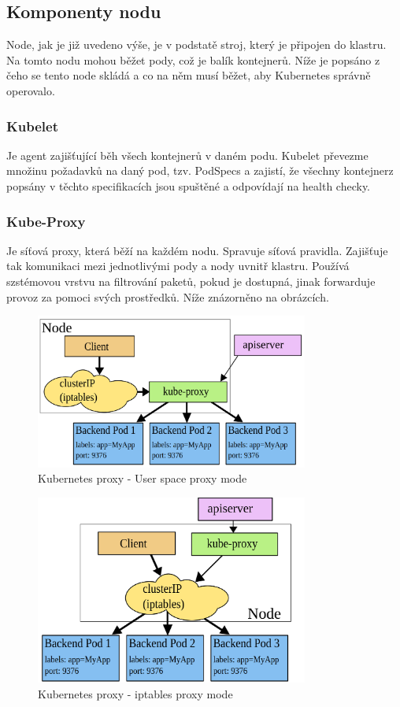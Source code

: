 \subsection{Komponenty nodu}

Node, jak je již uvedeno výše, je v podstatě stroj, který je připojen do klastru. Na tomto nodu mohou běžet pody, což je balík kontejnerů. Níže je popsáno z čeho se tento node skládá a co na něm musí běžet, aby Kubernetes správně operovalo.

\subsubsection{Kubelet}

Je agent zajišťující běh všech kontejnerů v daném podu. Kubelet převezme množinu požadavků na daný pod, tzv. PodSpecs a zajistí, že všechny kontejnerz popsány v těchto specifikacích jsou spuštěné a odpovídají na health checky. 

\subsubsection{Kube-Proxy}

Je síťová proxy, která běží na každém nodu. Spravuje síťová pravidla. Zajišťuje tak komunikaci mezi jednotlivými pody a nody uvnitř klastru. Používá szstémovou vrstvu na filtrování paketů, pokud je dostupná, jinak forwarduje provoz za pomoci svých prostředků. Níže znázorněno na obrázcích.
\begin{figure}[!ht]
	\centering
 	\includegraphics[width=0.8\textwidth, angle=0]{kubernetes-proxy.png}
 	\caption[Kubernetes proxy v user space módu]{Kubernetes proxy - User space proxy mode}\label{fig:usmp}
\end{figure}

\begin{figure}[!ht]
	\centering
 	\includegraphics[width=0.8\textwidth, angle=0]{kubernetes-proxyip.png}
 	\caption[Kubernetes proxy fungující s iptables]{Kubernetes proxy - iptables proxy mode}\label{fig:iptpm}
\end{figure}



